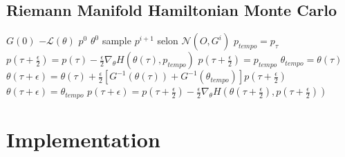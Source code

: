 \documentclass{beamer}
\begin{document}
  \subsection{Riemann Manifold Hamiltonian Monte Carlo}
  \begin{frame}
  

\begin{algorithmic}
\REQUIRE $G(0)$ $-\mathcal{L}(\theta)$ $p^0$ $\theta^0$
{}
\STATE sample $p^{i+1}$ selon $\mathcal{N}(O,G^i)$
\STATE $p_{tempo}=p_\tau$
\STATE $p\left(\tau +\frac{\epsilon}{2}\right)=p\left(\tau\right)-\frac{\epsilon}{2}\nabla_\theta H\left(\theta(\tau),p_{tempo}\right)$
\ENDFOR
\STATE $p\left(\tau +\frac{\epsilon}{2}\right) =p_{tempo}$
\STATE $\theta_{tempo}=\theta(\tau)$
\STATE $\theta(\tau +\epsilon)=\theta(\tau)+\frac{\epsilon}{2}\left[G^{-1}\left(\theta(\tau)\right)+G^{-1}\left(\theta_{tempo}\right)\right]p\left(\tau+\frac{\epsilon}{2}\right)$
\ENDFOR
\STATE $\theta(\tau+\epsilon)=\theta_{tempo}$
\STATE $p(\tau+\epsilon)=p\left(\tau+\frac{\epsilon}{2}\right)-\frac{\epsilon}{2}\nabla_\theta H\left(\theta\left(\tau+\frac{\epsilon}{2}\right),p\left(\tau+\frac{\epsilon}{2}\right)\right)$
\ENDFOR
\ENDFOR
\end{algorithmic}

  \end{frame}
  
  \section{Implementation}
  \begin{frame}
  
  \end{frame}

  \begin{frame}
  
  
  \end{frame}

  
\end{document}
